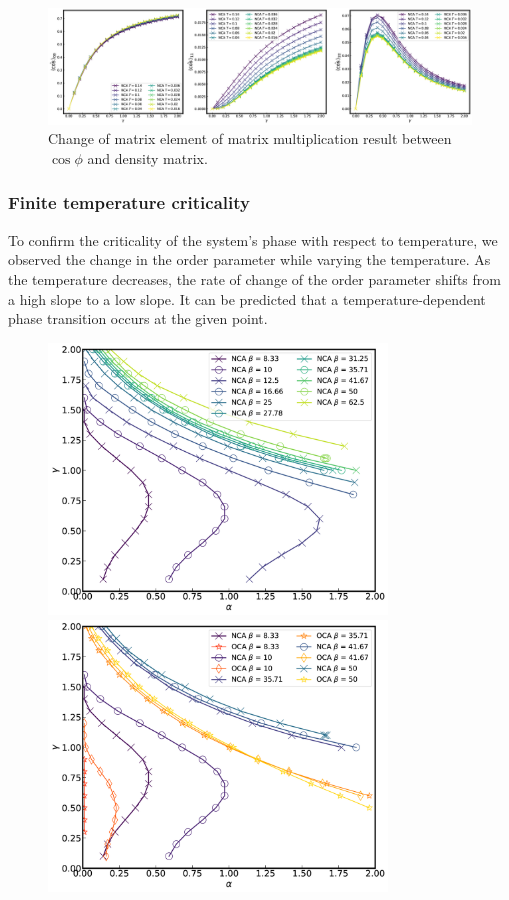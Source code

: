 \documentclass{article}[12pt]
\begin{document}
\begin{spacing}{1.5}
\begin{figure}[htbp]
  \centerline{\includegraphics[width=14cm]{TexFigure/Matele_Ns3_alp1.png}}
  \caption{Change of matrix element of matrix multiplication result between $\cos\phi$ and density matrix.}
\end{figure}
\subsubsection*{Finite temperature criticality}
To confirm the criticality of the system's phase with respect to temperature, 
we observed the change in the order parameter while varying the temperature. As the temperature decreases, 
the rate of change of the order parameter shifts from a high slope to a low slope. 
It can be predicted that a temperature-dependent phase transition occurs at the given point.\\
\begin{figure}[htbp]
  \centerline{\includegraphics[width=9cm]{TexFigure/3dplot_Ns3_proj_n (2).png}}
  \centerline{\includegraphics[width=9cm]{TexFigure/3dplot_COMP3_proj_n (2).png}}

\end{figure}
\end{spacing}
\end{document}
